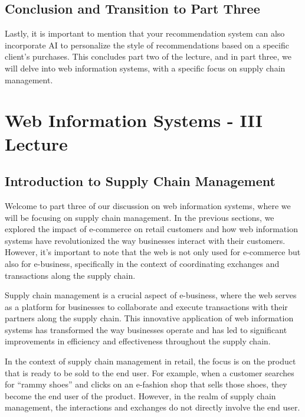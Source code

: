 \subsection{Conclusion and Transition to Part
  Three}\label{conclusion-and-transition-to-part-three}

Lastly, it is important to mention that your recommendation system can
also incorporate AI to personalize the style of
recommendations based on a specific client's purchases. This concludes
part two of the lecture, and in part three, we will delve into web
information systems, with a specific focus on supply chain management.

\section{Web Information Systems - III Lecture}

\subsection{Introduction to Supply Chain
  Management}\label{introduction-to-supply-chain-management}

Welcome to part three of our discussion on web information systems,
where we will be focusing on supply chain management. In the previous
sections, we explored the impact of e-commerce on retail customers and
how web information systems have revolutionized the way businesses
interact with their customers. However, it's important to note that the
web is not only used for e-commerce but also for e-business,
specifically in the context of coordinating exchanges and transactions
along the supply chain.

Supply chain management is a crucial aspect of e-business, where the web
serves as a platform for businesses to collaborate and execute
transactions with their partners along the supply chain. This innovative
application of web information systems has transformed the way
businesses operate and has led to significant improvements in efficiency
and effectiveness throughout the supply chain.

In the context of supply chain management in retail, the focus is on the
product that is ready to be sold to the end user. For example, when a
customer searches for ``rammy shoes'' and clicks on an e-fashion shop
that sells those shoes, they become the end user of the product.
However, in the realm of supply chain management, the interactions and
exchanges do not directly involve the end user.

